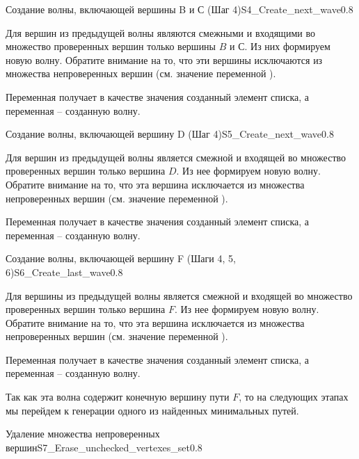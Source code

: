 \begin{itemize}
\begin{algostep}{Создание волны, включающей вершины B и С (Шаг
    4)}{S4_Create_next_wave}{0.8}
  
  Для вершин из предыдущей волны являются смежными и входящими во
  множество проверенных вершин только вершины $B$ и $С$. Из них
  формируем новую волну. Обратите внимание на то, что эти вершины
  исключаются из множества непроверенных вершин (см. значение
  переменной ).

  Переменная  получает в качестве значения
  созданный элемент списка, а переменная  – созданную
  волну.
\end{algostep}


\begin{algostep}{Создание волны, включающей вершину D (Шаг
    4)}{S5_Create_next_wave}{0.8}

  Для вершин из предыдущей волны является смежной и входящей во
  множество проверенных вершин только вершина $D$. Из нее формируем
  новую волну. Обратите внимание на то, что эта вершина исключается из
  множества непроверенных вершин (см. значение переменной
  ).

  Переменная  получает в качестве значения
  созданный элемент списка, а переменная  – созданную
  волну.
\end{algostep}


\begin{algostep}{Создание волны, включающей вершину F (Шаги 4, 5,
    6)}{S6_Create_last_wave}{0.8}

  Для вершины из предыдущей волны является смежной и входящей во
  множество проверенных вершин только вершина $F$. Из нее формируем
  новую волну. Обратите внимание на то, что эта вершина исключается из
  множества непроверенных вершин (см. значение переменной
  ).

  Переменная  получает в качестве значения
  созданный элемент списка, а переменная  – созданную
  волну.

  Так как эта волна содержит конечную вершину пути $F$, то на
  следующих этапах мы перейдем к генерации одного из найденных
  минимальных путей.
\end{algostep}


\begin{algostep}{Удаление множества непроверенных
    вершин}{S7_Erase_unchecked_vertexes_set}{0.8}
 

\end{algostep}
\end{itemize}
